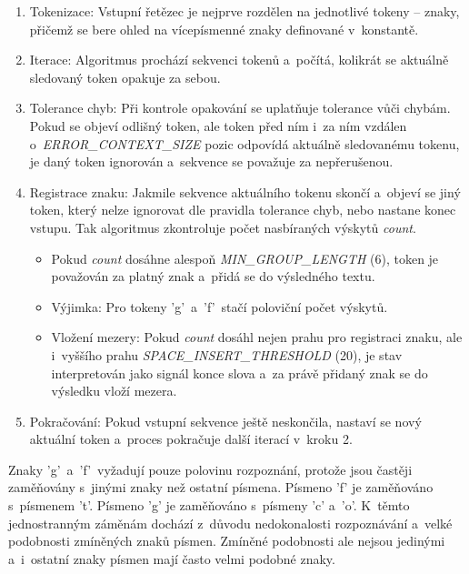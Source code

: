 \documentclass[
  master,
  program=ainfvs,
  biblatex,
  figures=true,
  tables=false,
  sourcecodes=true,
  glossaries,
  index
]{kidiplom}
\begin{document}
        \begin{enumerate}
            \item 
            Tokenizace: Vstupní řetězec je nejprve rozdělen na jednotlivé tokeny – znaky, přičemž se bere ohled na vícepísmenné znaky definované v~konstantě.
            
            \item 
            Iterace: Algoritmus prochází sekvenci tokenů a~počítá, kolikrát se aktuálně sledovaný token opakuje za sebou.
           
            \item 
            Tolerance chyb: Při kontrole opakování se uplatňuje tolerance vůči chybám. Pokud se objeví odlišný token, ale token před ním i~za ním vzdálen o~\emph{ERROR\_CONTEXT\_SIZE} pozic odpovídá aktuálně sledovanému tokenu, je daný token ignorován a~sekvence se považuje za nepřerušenou.
           
            \item 
            Registrace znaku: Jakmile sekvence aktuálního tokenu skončí a~objeví se jiný token, který nelze ignorovat dle pravidla tolerance chyb, nebo nastane konec vstupu. Tak algoritmus zkontroluje počet nasbíraných výskytů \emph{count}.
                \begin{itemize}
                    \item 
                        Pokud \emph{count} dosáhne alespoň \emph{MIN\_GROUP\_LENGTH} (6), token je považován za platný znak a~přidá se do výsledného textu.
                     \item 
                        Výjimka: Pro tokeny 'g'~a~'f'~stačí poloviční počet výskytů.
                    \item 
                        Vložení mezery: Pokud \emph{count} dosáhl nejen prahu pro registraci znaku, ale i~vyššího prahu \emph{SPACE\_INSERT\_THRESHOLD} (20), je stav interpretován jako signál konce slova a~za právě přidaný znak se do výsledku vloží mezera.
                \end{itemize}
            
            \item 
            Pokračování: Pokud vstupní sekvence ještě neskončila, nastaví se nový aktuální token a~proces pokračuje další iterací v~kroku 2.
        \end{enumerate}

    Znaky 'g'~a~'f'~vyžadují pouze polovinu rozpoznání, protože jsou častěji zaměňovány s~jinými znaky než ostatní písmena. Písmeno 'f' je zaměňováno s~písmenem 't'. Písmeno 'g' je zaměňováno s~písmeny 'c' a~'o'. K~těmto jednostranným záměnám dochází z~důvodu nedokonalosti rozpoznávání a~velké podobnosti zmíněných znaků písmen. Zmíněné podobnosti ale nejsou jedinými a~i~ostatní znaky písmen mají často velmi podobné znaky.
\end{document}
